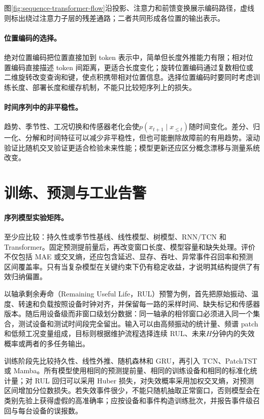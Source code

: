 图\ref{fig:sequence-transformer-flow}沿投影、注意力和前馈变换展示编码路径，虚线则标出绕过注意力子层的残差通路；二者共同形成各位置的输出表示。
\paragraph{位置编码的选择。}
绝对位置编码把位置直接加到 token 表示中，简单但长度外推能力有限；相对位置编码直接描述 token 间距离，更适合长度变化；旋转位置编码通过复数相位或二维旋转改变查询和键，使点积携带相对位置信息。选择位置编码时要同时考虑训练长度、部署长度和缓存机制，不能只比较短序列上的损失。

\paragraph{时间序列中的非平稳性。}
趋势、季节性、工况切换和传感器老化会使$p(x_{t+1}\mid x_{\le t})$随时间变化。差分、归一化、分解和时间特征可以减少非平稳性，但也可能删除故障前的有用趋势。滚动验证比随机交叉验证更适合检验未来性能；模型更新还应区分概念漂移与测量系统改变。

\section{训练、预测与工业告警}
\paragraph{序列模型实验矩阵。}
至少应比较：持久性或季节性基线、线性模型、树模型、RNN/TCN 和 Transformer。固定预测提前量后，再改变窗口长度、模型容量和缺失处理。评价不仅包括 MAE 或交叉熵，还应包含延迟、显存、吞吐、异常事件召回率和预测区间覆盖率。只有当复杂模型在关键约束下仍有稳定收益，才说明其结构提供了有效归纳偏置。

以轴承剩余寿命（Remaining Useful Life，RUL）预警为例，首先把原始振动、温度、转速和负载按照设备时钟对齐，并保留每一路的采样时间、缺失标记和传感器版本。随后用设备级而非窗口级划分数据：同一轴承的相邻窗口必须进入同一个集合，测试设备和测试时间段完全留出。输入可以由高频振动的统计量、频谱 patch 和低频工况变量组成，目标则根据维护流程选择连续 RUL、未来$H$分钟内的失效概率或两者的多任务输出。

训练阶段先比较持久性、线性外推、随机森林和 GRU，再引入 TCN、PatchTST 或 Mamba。所有模型使用相同的预测提前量、相同的训练设备和相同的标准化统计量；对 RUL 回归可以采用 Huber 损失，对失效概率采用加权交叉熵，对预测区间增加分位数损失。若失效事件很少，不能只随机抽取正常窗口，否则模型会在类别先验上获得虚假的高准确率；应按设备和事件构造训练批次，并报告事件级召回与每台设备的误报数。

